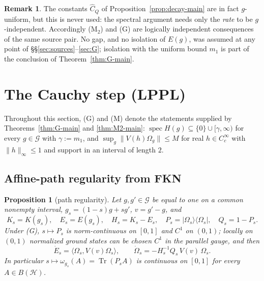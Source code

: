 \documentclass[11pt,a4paper]{article}
\theoremstyle{plain}
\newtheorem{proposition}[theorem]{Proposition}
\theoremstyle{definition}
\newtheorem{remark}[theorem]{Remark}
\newcommand{\G}{\mathcal{G}}
\newcommand{\HH}{\mathcal{H}}
\newcommand{\Om}{\Omega}
\newcommand{\ip}[2]{\langle #1,#2\rangle}
\DeclareMathOperator{\spec}{spec}
\begin{document}
\begin{remark}\label{rem:indep}
The constants $\widehat C_Q$ of Proposition~\ref{prop:decay-main} are in fact $g$-uniform, but
this is never used: the spectral argument needs only the \emph{rate} to be $g$-independent.
Accordingly (M$_2$) and (G) are logically independent consequences of the same source pair.
No gap, and no isolation of $E(g)$, was assumed at any point of
\S\S\ref{sec:sources}--\ref{sec:G}; isolation with the uniform bound $m_1$ is part of the
conclusion of Theorem~\ref{thm:G-main}.
\end{remark}

\section{The Cauchy step (LPPL)}\label{sec:lppl}

Throughout this section, (G) and (M) denote the statements supplied by
Theorems~\ref{thm:G-main} and \ref{thm:M2-main}: $\spec H(g)\subseteq\{0\}\cup[\gamma,\infty)$
for every $g\in\G$ with $\gamma:=m_1$, and $\sup_{g}\|V(h)\Om_g\|\le M$ for real
$h\in C_c^\infty$ with $\|h\|_\infty\le1$ and support in an interval of length $2$.

\subsection{Affine-path regularity from FKN}

\begin{proposition}[path regularity]\label{prop:FKNpath-main}
Let $g,g'\in\G$ be equal to one on a common nonempty interval, $g_s=(1-s)g+sg'$, $v=g'-g$, and
\[
  K_s=K(g_s),\quad E_s=E(g_s),\quad H_s=K_s-E_s,\quad
  P_s=|\Om_s\rangle\langle\Om_s|,\quad Q_s=1-P_s .
\]
Under \textup{(G)}, $s\mapsto P_s$ is norm-continuous on $[0,1]$ and $C^1$ on $(0,1)$; locally
on $(0,1)$ normalized ground states can be chosen $C^1$ in the parallel gauge, and then
\begin{equation}\label{eq:HFmain}
  \dot E_s=\ip{\Om_s}{V(v)\Om_s},\qquad
  \dot\Om_s=-H_s^{-1}Q_s\,V(v)\,\Om_s .
\end{equation}
In particular $s\mapsto\omega_{g_s}(A)=\operatorname{Tr}(P_sA)$ is continuous on $[0,1]$ for
every $A\in B(\HH)$.
\end{proposition}
\end{document}
